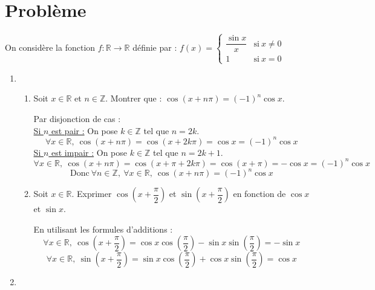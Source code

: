 \documentclass[a4paper,french,bookmarks]{article}
\begin{document}
\section*{Problème}
\noindent On considère la fonction $f: \mathbb{R} \to \mathbb{R}$ définie par : \quad $f(x)=\left\lbrace\begin{array}{cl}
    \dfrac{\sin x}{x} & \text{si} \ x \neq 0\\
    1 & \text{si} \ x = 0
\end{array}\right.$
\begin{enumerate}
  \item
  \begin{enumerate}
  \item Soit $x \in \mathbb{R}$ et $n \in \mathbb{Z}$. Montrer que : \quad $\cos\left(x + n\pi\right) = \left(-1\right)^n\cos x$.
  \begin{tcolorbox}[colback=black!3,colframe=black!9,boxrule=.25pt,enhanced,arc is angular,arc=0pt]
  Par disjonction de cas :\\
  \underline{Si $n$ est pair :} On pose $k \in \mathbb{Z}$ tel que $n = 2k$.\\
  \[ \forall x \in \mathbb{R}, \ \cos\left(x + n\pi\right) = \cos\left(x + 2k\pi\right) = \cos x = \left(-1\right)^n\cos x\]
    \underline{Si $n$ est impair :} On pose $k \in \mathbb{Z}$ tel que $n = 2k + 1$.\\
  \[ \forall x \in \mathbb{R}, \ \cos\left(x + n\pi\right) = \cos\left(x + \pi + 2k\pi\right) = \cos\left(x + \pi\right) = -\cos x = \left(-1\right)^n\cos x\]
  \[\text{Donc} \ \forall n\in \mathbb{Z}, \ \forall x \in \mathbb{R}, \ \cos\left(x + n\pi\right) = \left(-1\right)^n\cos x  \]
  \end{tcolorbox}
  \item Soit $x \in \mathbb{R}$. Exprimer $\cos\left(x+\dfrac{\pi}{2}\right)$ et  $\sin\left(x+\dfrac{\pi}{2}\right)$ en fonction de $\cos x$ et $\sin x$.
  \begin{tcolorbox}[colback=black!3,colframe=black!9,boxrule=.25pt,enhanced,arc is angular,arc=0pt]
  En utilisant les formules d'additions :
  \[ \forall x \in \mathbb{R}, \ \cos\left(x + \dfrac{\pi}{2}\right) = \cos x\cos\left(\dfrac{\pi}{2}\right) - \sin x\sin\left(\dfrac{\pi}{2}\right) = -\sin x\]
  \[ \forall x \in \mathbb{R}, \ \sin\left(x + \dfrac{\pi}{2}\right) = \sin x\cos\left(\dfrac{\pi}{2}\right) + \cos x\sin\left(\dfrac{\pi}{2}\right) = \cos x\]
  \end{tcolorbox}
\end{enumerate}
\item 

\end{enumerate}
\end{document}
